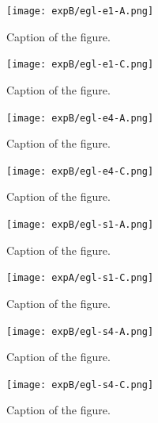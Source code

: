 \documentclass[twoside]{ctuthesis}
\theoremstyle{plain}
\theoremstyle{definition}
\theoremstyle{note}
\begin{document}
\begin{figure}[htbp]
	\centering
	\texttt{[image: expB/egl-e1-A.png]}
	\caption{Caption of the figure.}
	\label{fig:your-figure}
\end{figure}
\begin{figure}[htbp]
	\centering
	\texttt{[image: expB/egl-e1-C.png]}
	\caption{Caption of the figure.}
	\label{fig:your-figure}
\end{figure}
\begin{figure}[htbp]
	\centering
	\texttt{[image: expB/egl-e4-A.png]}
	\caption{Caption of the figure.}
	\label{fig:your-figure}
\end{figure}
\begin{figure}[htbp]
	\centering
	\texttt{[image: expB/egl-e4-C.png]}
	\caption{Caption of the figure.}
	\label{fig:your-figure}
\end{figure}
\begin{figure}[htbp]
	\centering
	\texttt{[image: expB/egl-s1-A.png]}
	\caption{Caption of the figure.}
	\label{fig:your-figure}
\end{figure}
\begin{figure}[htbp]
	\centering
	\texttt{[image: expA/egl-s1-C.png]}
	\caption{Caption of the figure.}
	\label{fig:your-figure}
\end{figure}
\begin{figure}[htbp]
	\centering
	\texttt{[image: expB/egl-s4-A.png]}
	\caption{Caption of the figure.}
	\label{fig:your-figure}
\end{figure}
\begin{figure}[htbp]
	\centering
	\texttt{[image: expB/egl-s4-C.png]}
	\caption{Caption of the figure.}
	\label{fig:your-figure}
\end{figure}








\end{document}
